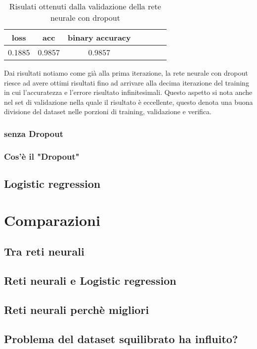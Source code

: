 \renewcommand{\arraystretch}{1.4}
\begin{table}[H]
	\begin{center}
		\begin{tabular}{|c|c|c|c|c|c|c|}
			\hline
			 \textbf{loss} & \textbf{acc} & \textbf{binary accuracy} \\ \hline
			0.1885  & 0.9857 & 0.9857 \\ \hline
		\end{tabular}
		\caption{Risulati ottenuti dalla validazione della rete neurale con dropout\label{}}
	\end{center}
\end{table}
\renewcommand{\arraystretch}{1}
Dai risultati notiamo come già alla prima iterazione, la rete neurale con dropout riesce ad avere ottimi risultati fino ad arrivare alla decima iterazione del training in cui l'accuratezza e l'errore risultato infinitesimali.
Questo aspetto si nota anche nel set di validazione nella quale il risultato è eccellente, questo denota una buona divisione del dataset nelle porzioni di training, validazione e verifica.
\subsubsection{senza Dropout}
\subsubsection{Cos'è il "Dropout"}
\subsection{Logistic regression}
\section{Comparazioni}
\subsection{Tra reti neurali}
\subsection{Reti neurali e Logistic regression}
\subsection{Reti neurali perchè migliori}
\subsection{Problema del dataset squilibrato ha influito?}
